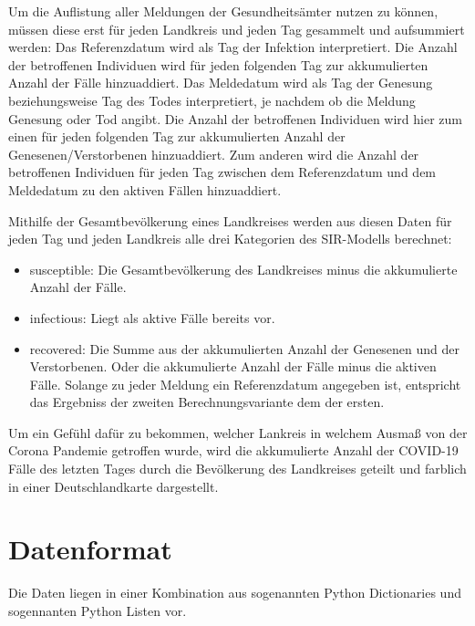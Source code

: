 Um die Auflistung aller Meldungen der Gesundheitsämter nutzen zu können, müssen diese erst für jeden Landkreis und jeden Tag gesammelt und aufsummiert werden:
Das Referenzdatum wird als Tag der Infektion interpretiert. Die Anzahl der betroffenen Individuen wird für jeden folgenden Tag zur akkumulierten Anzahl der Fälle hinzuaddiert.
Das Meldedatum wird als Tag der Genesung beziehungsweise Tag des Todes interpretiert, je nachdem ob die Meldung Genesung oder Tod angibt. Die Anzahl der betroffenen Individuen wird hier zum einen für jeden folgenden Tag zur akkumulierten Anzahl der Genesenen/Verstorbenen hinzuaddiert. Zum anderen wird die Anzahl der betroffenen Individuen für jeden Tag zwischen dem Referenzdatum und dem Meldedatum zu den aktiven Fällen hinzuaddiert.

Mithilfe der Gesamtbevölkerung eines Landkreises werden aus diesen Daten für jeden Tag und jeden Landkreis alle drei Kategorien des SIR-Modells berechnet:

\begin{itemize}
    \item \glqq{}susceptible\grqq{}: Die Gesamtbevölkerung des Landkreises minus die akkumulierte Anzahl der Fälle.
    \item \glqq{}infectious\grqq{}: Liegt als aktive Fälle bereits vor.
    \item \glqq{}recovered\grqq{}:
    Die Summe aus der akkumulierten Anzahl der Genesenen und der Verstorbenen. Oder die akkumulierte Anzahl der Fälle minus die aktiven Fälle. Solange zu jeder Meldung ein Referenzdatum angegeben ist, entspricht das Ergebniss der zweiten Berechnungsvariante dem der ersten.
\end{itemize}

Um ein Gefühl dafür zu bekommen, welcher Lankreis in welchem Ausmaß von der Corona Pandemie getroffen wurde, wird die akkumulierte Anzahl der COVID-19 Fälle des letzten Tages durch die Bevölkerung des Landkreises geteilt und farblich in einer Deutschlandkarte dargestellt.

\section{Datenformat}
Die Daten liegen in einer Kombination aus sogenannten Python Dictionaries und sogennanten Python Listen vor.


